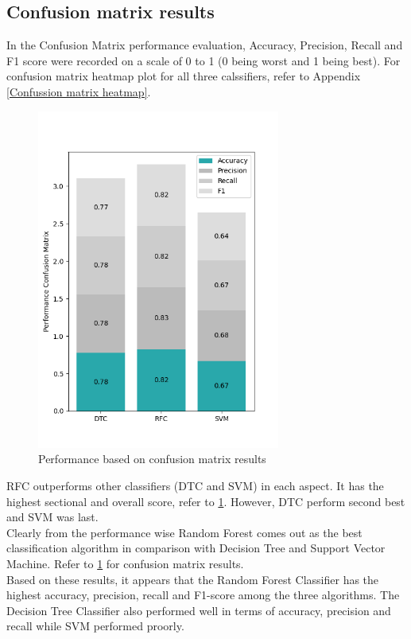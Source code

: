 \documentclass[conference]{IEEEtran}
\begin{document}
	\subsection{Confusion matrix results}
	In the Confusion Matrix performance evaluation, Accuracy, Precision, Recall and F1 score were recorded on a scale of 0 to 1 (0 being worst and 1 being best). For confusion matrix heatmap plot for all three calssifiers, refer to Appendix \figurename\ref{Confussion matrix heatmap}.\\
		\begin{figure}[H]{}
		\centerline{\includegraphics[width=80mm,scale=1]{Performance_CM.png}}
		\caption{Performance based on confusion matrix results}
		\label{Performance_CM}
	\end{figure}
	RFC outperforms other classifiers (DTC and SVM) in each aspect. It has the highest sectional and overall score, refer to \figurename{\ref{Performance_CM}}. However, DTC perform second best and SVM was last.\\
	Clearly from the performance wise Random Forest comes out as the best classification algorithm in comparison with Decision Tree and Support Vector Machine. Refer to \figurename{\ref{Performance_CM}} for confusion matrix results.\\
	Based on these results, it appears that the Random Forest Classifier has the highest accuracy, precision, recall and F1-score among the three algorithms. The Decision Tree Classifier also performed well in terms of accuracy, precision and recall while SVM performed proorly.
\end{document}
